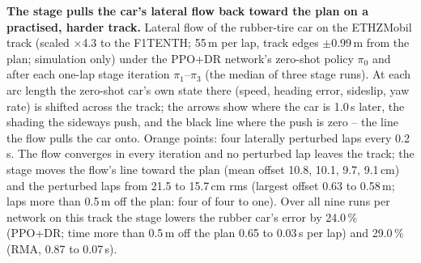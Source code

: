 \caption{\textbf{The stage pulls the car's lateral flow back toward the plan on a practised, harder track.} Lateral flow of the rubber-tire
car on the ETHZMobil track (scaled $\times$4.3 to the F1TENTH; 55\,m per lap, track edges $\pm$0.99\,m from the plan; simulation only)
under the PPO+DR network's zero-shot policy $\pi_0$ and after each one-lap stage iteration $\pi_1$--$\pi_3$ (the median of three stage
runs). At each arc length the zero-shot car's own state there (speed, heading error, sideslip, yaw rate) is shifted across the track; the
arrows show where the car is 1.0\,s later, the shading the sideways push, and the black line where the push is zero -- the line the flow
pulls the car onto. Orange points: four laterally perturbed laps every 0.2\,s. The flow converges in every iteration and no perturbed lap
leaves the track; the stage moves the flow's line toward the plan (mean offset 10.8, 10.1, 9.7, 9.1\,cm) and the perturbed laps from 21.5
to 15.7\,cm rms (largest offset 0.63 to 0.58\,m; laps more than 0.5\,m off the plan: four of four to one). Over all nine runs per network on
this track the stage lowers the rubber car's error by 24.0\,\% (PPO+DR; time more than 0.5\,m off the plan 0.65 to 0.03\,s per lap) and
29.0\,\% (RMA, 0.87 to 0.07\,s).}
